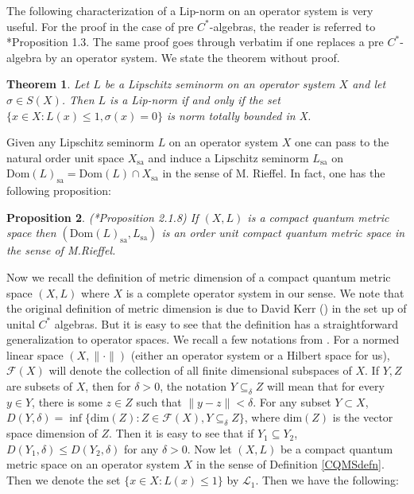 \documentclass[a4paper,11pt,reqno]{amsart}
\theoremstyle{plain}
\newtheorem{thm}{Theorem}[section]
\newtheorem{prop}[thm]{Proposition}
\theoremstyle{mainthmstyle}
\theoremstyle{named}
\numberwithin{equation}{section}
\begin{document}
The following characterization of a Lip-norm on an operator system is very useful. For the proof in the case of pre $C^{\ast}$-algebras, the reader is referred to \cite{Ozawa-Rieffel}*{Proposition 1.3}. The same proof goes through verbatim if one replaces a pre $C^{\ast}$-algebra by an operator system. We state the theorem without proof.
\begin{thm}\label{totbouiff}
    Let $L$ be a Lipschitz seminorm on an operator system $X$ and let $\sigma\in S(X)$. Then $L$ is a Lip-norm if and only if the set $\{x\in X: L(x)\leq 1, \sigma(x)=0\}$ is norm totally bounded in X. 
\end{thm}
Given any Lipschitz seminorm $L$ on an operator system $X$ one can pass to the natural order unit space $X_{\mathrm{sa}}$ and induce a Lipschitz seminorm $L_{\mathrm{sa}}$ on $\mathrm{Dom}(L)_{\mathrm{sa}}=\mathrm{Dom}(L)\cap X_{\mathrm{sa}}$ in the sense of M. Rieffel. In fact, one has the following proposition:
\begin{prop}\label{operatorsystemtoorder}(\cite{Kaad-Kyed}*{Proposition 2.1.8})
    If $(X,L)$ is a compact quantum metric space then $(\mathrm{Dom}(L)_{\mathrm{sa}},L_{\mathrm{sa}})$ is an order unit compact quantum metric space in the sense of M.Rieffel.
\end{prop}
Now we recall the definition of metric dimension of a compact quantum metric space $(X,L)$ where $X$ is a complete operator system in our sense. We note that the original definition of metric dimension is due to David Kerr (\cite{Kerr}) in the set up of unital $C^{\ast}$ algebras. But it is easy to see that the definition has a straightforward generalization to operator spaces. We recall a few notations from \cite{Kerr}. For a normed linear space $(X,\| \cdot \|)$ (either an operator system or a Hilbert space for us), $\mathcal{F}(X)$ will denote the collection of all finite dimensional subspaces of $X$. If $Y,Z$ are subsets of $X$, then for $\delta>0$, the notation $Y\subseteq_{\delta} Z$ will mean that for every $y\in Y$, there is some $z\in Z$ such that $\|y-z\| <\delta$. For any subset $Y\subset X$, $D(Y,\delta)=\inf\{{\textrm{dim}}(Z):Z\in\mathcal{F}(X), Y\subseteq_{\delta}Z\}$, where $\textrm{dim}(Z)$ is the vector space dimension of $Z$. Then it is easy to see that if $Y_{1}\subseteq Y_{2}$, $D(Y_{1},\delta)\leq D(Y_{2},\delta)$ for any $\delta>0$. Now let $(X,L)$ be a compact quantum metric space on an operator system $X$ in the sense of Definition \ref{CQMSdefn}. Then we denote the set $\{x\in X:L(x)\leq 1\}$ by $\mathcal{L}_1$. Then we have the following:
\end{document}
